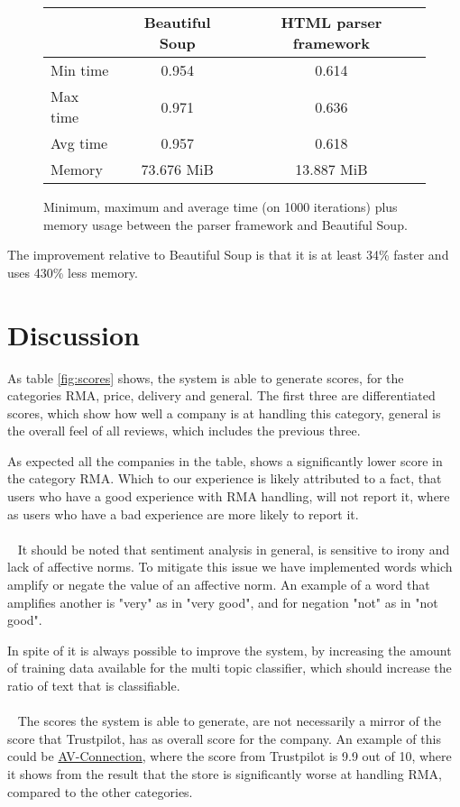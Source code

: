 \documentclass[10pt]{IEEEtran}
\begin{document}
\begin{figure}[!h]
	\vspace*{2mm}
	\centering
	\begin{tabular}{ | l | c | c | }
  		\hline
   		 & \textbf{Beautiful Soup} & \textbf{HTML parser framework} \\ \hline
  		Min time & 0.954 & 0.614 \\ \hline
  		Max time & 0.971 & 0.636 \\ \hline
  		Avg time & 0.957 & 0.618 \\ \hline
  		Memory & 73.676 MiB & 13.887 MiB \\ \hline
	\end{tabular}
	\caption{Minimum, maximum and average time (on 1000 iterations) plus memory usage between the parser framework and Beautiful Soup. \label{fig:profiling}}
\end{figure}

The improvement relative to Beautiful Soup is that it is at least {\color{green} 34\%} faster and uses {\color{green} 430\%} less memory.

\section{Discussion}
As table \ref{fig:scores} shows, the system is able to generate scores, for the categories RMA, price, delivery and general. The first three are differentiated scores, which show how well a company is at handling this category, general is the overall feel of all reviews, which includes the previous three.

As expected all the companies in the table, shows a significantly lower score in the category RMA. Which to our experience is likely attributed to a fact, that users who have a good experience with RMA handling, will not report it, where as users who have a bad experience are more likely to report it.
\\~
\\~
It should be noted that sentiment analysis in general, is sensitive to irony and lack of affective norms. To mitigate this issue we have implemented words which amplify or negate the value of an affective norm. An example of a word that amplifies another is "very" as in "very good", and for negation "not" as in "not good".

In spite of it is always possible to improve the system, by increasing the amount of training data available for the multi topic classifier, which should increase the ratio of text that is classifiable.
\\~
\\~
The scores the system is able to generate, are not necessarily a mirror of the score that Trustpilot, has as overall score for the company. An example of this could be \href{http://www.trustpilot.dk/review/www.av-connection.dk}{AV-Connection}, where the score from Trustpilot is 9.9 out of 10, where it shows from the result that the store is significantly worse at handling RMA, compared to the other categories. 
\end{document}
